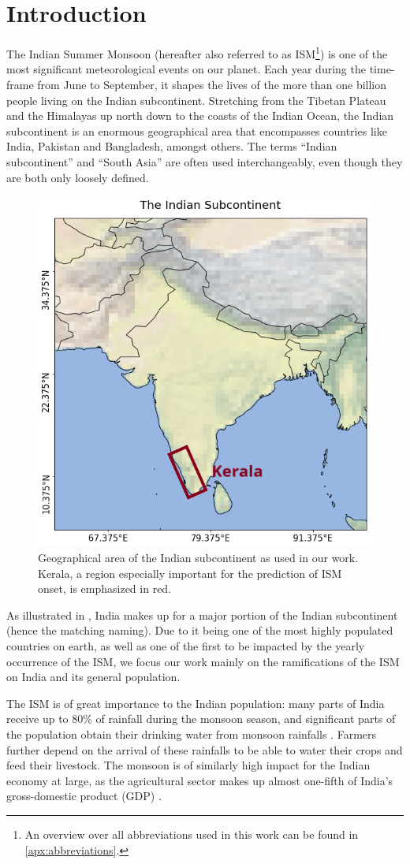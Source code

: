 \chapter{Introduction}
\label{c:introduction}

The Indian Summer Monsoon (hereafter also referred to as ISM\footnote{An overview over all abbreviations used in this work can be found in \cref{apx:abbreviations}.}) is one of the most significant meteorological events on our planet. Each year during the time-frame from June to September, it shapes the lives of the more than one billion people living on the Indian subcontinent. Stretching from the Tibetan Plateau and the Himalayas up north down to the coasts of the Indian Ocean, the Indian subcontinent is an enormous geographical area that encompasses countries like India, Pakistan and Bangladesh, amongst others. The terms ``Indian subcontinent'' and ``South Asia'' are often used interchangeably, even though they are both only loosely defined.

\begin{figure}[h]
  \centering
  \includegraphics[width=0.3\linewidth]{./99_appendix/img/area_overview_kerala}
  \caption{Geographical area of the Indian subcontinent as used in our work. Kerala, a region especially important for the prediction of ISM onset, is emphasized in red.}
  \label{fig:the_indian_subcontinent}
\end{figure}

As illustrated in , India makes up for a major portion of the Indian subcontinent (hence the matching naming). Due to it being one of the most highly populated countries on earth, as well as one of the first to be impacted by the yearly occurrence of the ISM, we focus our work mainly on the ramifications of the ISM on India and its general population.

The ISM is of great importance to the Indian population: many parts of India receive up to 80\% of rainfall during the monsoon season, and significant parts of the population obtain their drinking water from monsoon rainfalls \citep{Stolbova.2015}. Farmers further depend on the arrival of these rainfalls to be able to water their crops and feed their livestock. The monsoon is of similarly high impact for the Indian economy at large, as the agricultural sector makes up almost one-fifth of India's gross-domestic product (GDP) \citep{CentralIntelligenceAgency.05.01.2018}.

